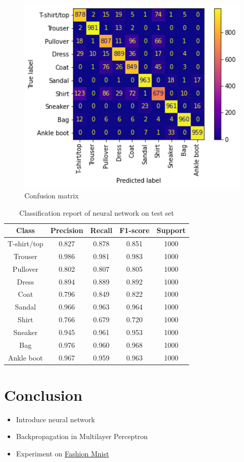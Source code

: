 \documentclass[14pt, a4paper]{article}
\numberwithin{equation}{section}
\numberwithin{algorithm}{section}
\numberwithin{figure}{section}
\begin{document}
\begin{figure}[h!]
  \centering
  \includegraphics[width=12cm]{confusion_matrix.png}
  \caption{Confusion matrix}
\end{figure}

\begin{table} [h!]
  \centering
  \begin{tabular}{ || c | c | c | c | c|| }
  \hline
  Class & Precision & Recall & F1-score & Support \\ [0.5 ex]
  \hline \hline
  T-shirt/top & 0.827 & 0.878 & 0.851 & 1000 \\ \hline
  Trouser & 0.986 & 0.981 & 0.983 & 1000  \\ \hline
  Pullover & 0.802 & 0.807 & 0.805 & 1000 \\ \hline
  Dress & 0.894 & 0.889 & 0.892 & 1000 \\ \hline
  Coat & 0.796 & 0.849 & 0.822 & 1000 \\ \hline
  Sandal & 0.966 &0.963 & 0.964 & 1000\\ \hline
  Shirt & 0.766 & 0.679 & 0.720 & 1000\\ \hline 
  Sneaker & 0.945 & 0.961 & 0.953 & 1000 \\ \hline
  Bag &  0.976 & 0.960 & 0.968 & 1000 \\ \hline
  Ankle boot & 0.967 & 0.959 & 0.963 & 1000 \\ [1ex]
  \hline
  \end{tabular}
  \caption{Classification report of neural network on test set}
\end{table}

\section{Conclusion}

\begin{itemize}
  \item Introduce neural network
    \item Backpropagation in Multilayer Perceptron
    \item Experiment on \href{https://github.com/zalandoresearch/fashion-mnist}{Fashion Mnist}
\end{itemize}

\newpage
{}
\printbibliography[title={References}]
\end{document}
